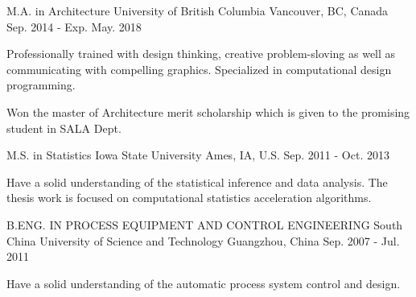 

\begin{cventries}

    \cventry
        {M.A. in Architecture} %
        {University of British Columbia} %
        {Vancouver, BC, Canada} %
        {Sep. 2014 - Exp. May. 2018} %
        {
        \begin{cvitems} %
            \item {Professionally trained with design thinking, creative problem-sloving as well as
            communicating with compelling graphics. Specialized in computational design programming.}
            \item {Won the master of Architecture merit scholarship which is given to the promising student in SALA Dept. }
        \end{cvitems}
        }

    \cventry
        {M.S. in Statistics} %
        {Iowa State University} %
        {Ames, IA, U.S.} %
        {Sep. 2011 - Oct. 2013} %
        {
        \begin{cvitems} %
          \item {Have a solid understanding of the statistical inference and data analysis.
The thesis work is focused on computational statistics acceleration algorithms.}
        \end{cvitems}
        }

    \cventry
        {B.ENG. IN PROCESS EQUIPMENT AND CONTROL ENGINEERING} %
        {South China University of Science and Technology} %
        {Guangzhou, China} %
        {Sep. 2007 - Jul. 2011} %
        {
          \begin{cvitems} %
            \item {Have a solid understanding of the automatic process system control and design.}
          \end{cvitems}
        }


\end{cventries}
